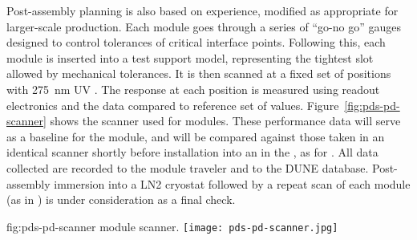 Post-assembly  planning is also based on  experience, modified as appropriate for larger-scale production.  Each  module goes through a series of ``go-no go'' gauges 
designed to control tolerances of critical interface points.  Following this, each module is inserted into a test  support model, representing the tightest slot allowed by  mechanical tolerances.
It is then scanned at a fixed set of positions with \SI{275}{nm} UV .  
The  response at each position is measured using  readout electronics and the data compared to reference set of values.
Figure~\ref{fig:pds-pd-scanner} shows %
the scanner used for  modules. These performance data will serve as a baseline for the  module, and will be compared against those taken in an identical scanner shortly before installation into an  in the , as for . %
All data collected are recorded to the module traveler and to the DUNE  database.
Post-assembly immersion into a LN2 cryostat followed by a repeat scan of each  module (as in ) is under consideration as a final  check.

\begin{dunefigure}{fig:pds-pd-scanner}
{ module scanner.}
  \texttt{[image: pds-pd-scanner.jpg]}
\end{dunefigure}


